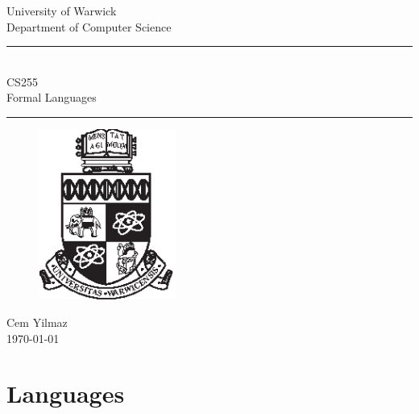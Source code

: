 \documentclass[a4paper]{article}
\theoremstyle{plain}
\theoremstyle{definition}
\theoremstyle{remark}
\begin{document}
	\begin{titlepage}
	\begin{center}
	\large
	University of Warwick \\
	Department of Computer Science \\
	\huge
	\vspace{50mm}
	\rule{\linewidth}{0.5pt} \\
	CS255 \\
	\vspace{5mm}
	\Large
	Formal Languages
	\rule{\linewidth}{0.5pt}
	\vspace{5mm}
	\begin{figure}[H]
	\centering
	\includegraphics[width=0.4\textwidth]{crest_black.eps}
	\end{figure}
	\vspace{37mm}
	Cem Yilmaz \\
	\today
	\end{center}
	\end{titlepage}
	\tableofcontents
	\newpage
	\section{Languages}
\end{document}

